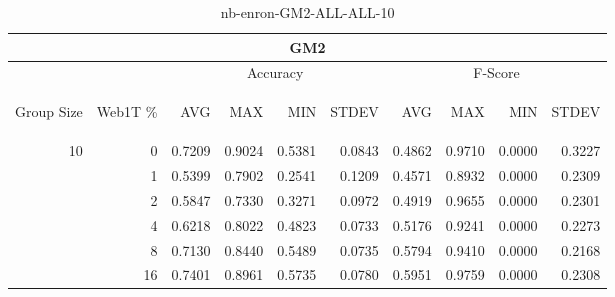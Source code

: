 \begin{center}
\begin{table}[htbp] 
 \begin{center}
\begin{tabular}{ | r | r | r | r | r | r | r | r | r | r |}
\hline
\multicolumn{10}{|c|}{GM2}\\
\hline
 & & \multicolumn{4}{|c|}{Accuracy} & \multicolumn{4}{|c|}{F-Score}\\ \cline{3-10}
\begin{sideways}Group Size\end{sideways} & \begin{sideways}Web1T \%\end{sideways} & \begin{sideways}AVG\end{sideways} & \begin{sideways}MAX\end{sideways} & \begin{sideways}MIN\end{sideways} & \begin{sideways}STDEV\end{sideways} & \begin{sideways}AVG\end{sideways} & \begin{sideways}MAX\end{sideways} & \begin{sideways}MIN\end{sideways} & \begin{sideways}STDEV\end{sideways}\\
\hline
\multirow{5}{*}{10}
 & 0 & 0.7209 & 0.9024 & 0.5381 & 0.0843 & 0.4862 & 0.9710 & 0.0000 & 0.3227\\ \cline{2-10}
 & 1 & 0.5399 & 0.7902 & 0.2541 & 0.1209 & 0.4571 & 0.8932 & 0.0000 & 0.2309\\ \cline{2-10}
 & 2 & 0.5847 & 0.7330 & 0.3271 & 0.0972 & 0.4919 & 0.9655 & 0.0000 & 0.2301\\ \cline{2-10}
 & 4 & 0.6218 & 0.8022 & 0.4823 & 0.0733 & 0.5176 & 0.9241 & 0.0000 & 0.2273\\ \cline{2-10}
 & 8 & 0.7130 & 0.8440 & 0.5489 & 0.0735 & 0.5794 & 0.9410 & 0.0000 & 0.2168\\ \cline{2-10}
 & 16 & 0.7401 & 0.8961 & 0.5735 & 0.0780 & 0.5951 & 0.9759 & 0.0000 & 0.2308\\ \cline{2-10}
\hline
\end{tabular}
\caption{nb-enron-GM2-ALL-ALL-10}
\label{table:nb-enron-GM2-ALL-ALL-10}
\end{center}
 \end{table}
\end{center}

